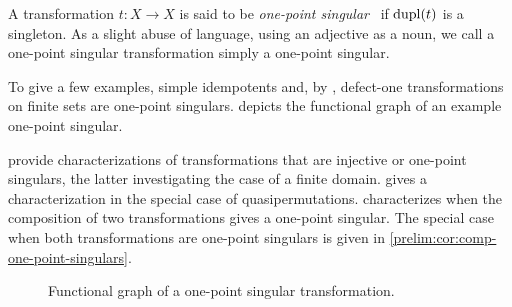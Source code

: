 
A transformation $t \colon X \to X$ 
is said to be \emph{one-point singular}~\cite{Rystsov2024}
if $\operatorname{dupl}(t)$ is a singleton. 
As a slight abuse of language, using an adjective as a noun, we call
a one-point singular transformation simply a one-point singular.

To give a few examples, simple idempotents
and, by  ,
defect-one transformations on finite sets are one-point singulars.
 depicts the functional graph
of an example one-point singular.

provide characterizations of transformations
that are injective or one-point singulars,
the latter investigating the case of a finite domain.
 gives a characterization
in the special case of quasipermutations.
characterizes when the composition of two transformations
gives a one-point singular. The special case when both transformations
are one-point singulars is given in \cref{prelim:cor:comp-one-point-singulars}.

\begin{figure}[ht]
	\centering
	\caption[Functional graph of a one-point singular]{Functional graph of a one-point singular transformation.}
	\label{prelim:trans:fig:onepointsing}
\end{figure}

